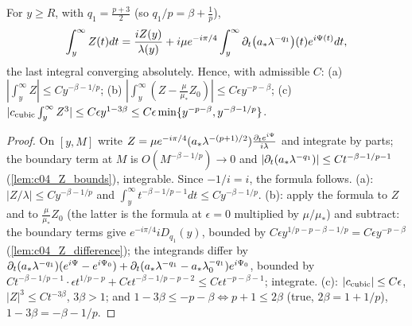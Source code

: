 \begin{lemma}
  \label{lem:c04_Z_primitive}
  For $y\ge R$, with $q_1=\frac{p+3}2$ (so $q_1/p=\beta+\frac1p$),
  \[
    \int_y^\infty Z(t)dt=\frac{iZ(y)}{\lambda(y)}+i\mu e^{-i\pi/4}\int_y^\infty\partial_t\bigl(a_*\lambda^{-q_1}\bigr)(t)e^{i\Psi(t)}dt,
  \]
  the last integral converging absolutely. Hence, with admissible $C$:
  (a) $|\int_y^\infty Z|\le Cy^{-\beta-1/p}$; (b) $|\int_y^\infty(Z-\frac\mu{\mu_*}Z_0)|\le C\epsilon y^{-p-\beta}$;
  (c) $|c_{\textup{cubic}}\int_y^\infty Z^3|\le C\epsilon y^{1-3\beta}\le C\epsilon\min\{y^{-p-\beta},y^{-\beta-1/p}\}$.
\end{lemma}
\begin{proof}
  On $[y,M]$ write $Z=\mu e^{-i\pi/4}(a_*\lambda^{-(p+1)/2})\frac{\partial_te^{i\Psi}}{i\lambda}$ and integrate by parts; the boundary term at $M$ is
  $O(M^{-\beta-1/p})\to0$ and $|\partial_t(a_*\lambda^{-q_1})|\le Ct^{-\beta-1/p-1}$ (\cref{lem:c04_Z_bounds}), integrable. Since $-1/i=i$, the formula
  follows. (a): $|Z/\lambda|\le Cy^{-\beta-1/p}$ and $\int_y^\infty t^{-\beta-1/p-1}dt\le Cy^{-\beta-1/p}$. (b): apply the formula to $Z$ and to
  $\frac\mu{\mu_*}Z_0$ (the latter is the formula at $\epsilon=0$ multiplied by $\mu/\mu_*$) and subtract: the boundary terms give
  $e^{-i\pi/4}iD_{q_1}(y)$, bounded by $C\epsilon y^{1/p-p-\beta-1/p}=C\epsilon y^{-p-\beta}$ (\cref{lem:c04_Z_difference}); the integrands differ by
  $\partial_t(a_*\lambda^{-q_1})(e^{i\Psi}-e^{i\Psi_0})+\partial_t(a_*\lambda^{-q_1}-a_*\lambda_0^{-q_1})e^{i\Psi_0}$, bounded by
  $Ct^{-\beta-1/p-1}\cdot\epsilon t^{1/p-p}+C\epsilon t^{-\beta-1/p-p-2}\le C\epsilon t^{-p-\beta-1}$; integrate. (c): $|c_{\textup{cubic}}|\le C\epsilon$,
  $|Z|^3\le Ct^{-3\beta}$, $3\beta>1$; and $1-3\beta\le-p-\beta\iff p+1\le2\beta$ (true, $2\beta=1+1/p$), $1-3\beta=-\beta-1/p$.
\end{proof}

